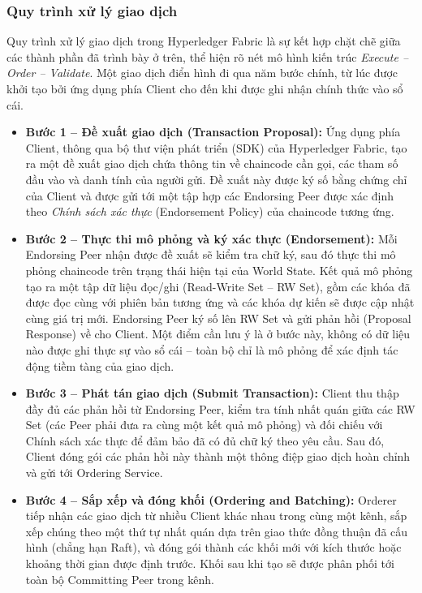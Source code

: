 \subsubsection{Quy trình xử lý giao dịch}

Quy trình xử lý giao dịch trong Hyperledger Fabric là sự kết hợp chặt chẽ giữa các thành phần đã trình bày ở trên, thể hiện rõ nét mô hình kiến trúc \textit{Execute -- Order -- Validate}. Một giao dịch điển hình đi qua năm bước chính, từ lúc được khởi tạo bởi ứng dụng phía Client cho đến khi được ghi nhận chính thức vào sổ cái.

\begin{itemize}
    \item \textbf{Bước 1 -- Đề xuất giao dịch (Transaction Proposal):} Ứng dụng phía Client, thông qua bộ thư viện phát triển (SDK) của Hyperledger Fabric, tạo ra một đề xuất giao dịch chứa thông tin về chaincode cần gọi, các tham số đầu vào và danh tính của người gửi. Đề xuất này được ký số bằng chứng chỉ của Client và được gửi tới một tập hợp các Endorsing Peer được xác định theo \textit{Chính sách xác thực} (Endorsement Policy) của chaincode tương ứng.

    \item \textbf{Bước 2 -- Thực thi mô phỏng và ký xác thực (Endorsement):} Mỗi Endorsing Peer nhận được đề xuất sẽ kiểm tra chữ ký, sau đó thực thi mô phỏng chaincode trên trạng thái hiện tại của World State. Kết quả mô phỏng tạo ra một tập dữ liệu đọc/ghi (Read-Write Set -- RW Set), gồm các khóa đã được đọc cùng với phiên bản tương ứng và các khóa dự kiến sẽ được cập nhật cùng giá trị mới. Endorsing Peer ký số lên RW Set và gửi phản hồi (Proposal Response) về cho Client. Một điểm cần lưu ý là ở bước này, không có dữ liệu nào được ghi thực sự vào sổ cái -- toàn bộ chỉ là mô phỏng để xác định tác động tiềm tàng của giao dịch.

    \item \textbf{Bước 3 -- Phát tán giao dịch (Submit Transaction):} Client thu thập đầy đủ các phản hồi từ Endorsing Peer, kiểm tra tính nhất quán giữa các RW Set (các Peer phải đưa ra cùng một kết quả mô phỏng) và đối chiếu với Chính sách xác thực để đảm bảo đã có đủ chữ ký theo yêu cầu. Sau đó, Client đóng gói các phản hồi này thành một thông điệp giao dịch hoàn chỉnh và gửi tới Ordering Service.

    \item \textbf{Bước 4 -- Sắp xếp và đóng khối (Ordering and Batching):} Orderer tiếp nhận các giao dịch từ nhiều Client khác nhau trong cùng một kênh, sắp xếp chúng theo một thứ tự nhất quán dựa trên giao thức đồng thuận đã cấu hình (chẳng hạn Raft), và đóng gói thành các khối mới với kích thước hoặc khoảng thời gian được định trước. Khối sau khi tạo sẽ được phân phối tới toàn bộ Committing Peer trong kênh.


\end{itemize}
